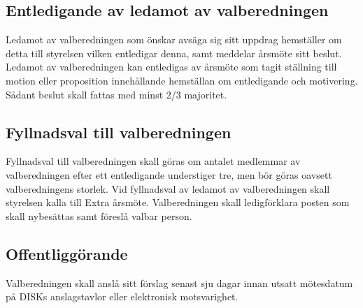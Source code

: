 	\subsection{Entledigande av ledamot av valberedningen}
	\label{subsec:entledigandeavledamotavvalberedningen}
		Ledamot av valberedningen som önskar avsäga sig sitt uppdrag hemställer om detta till styrelsen vilken entledigar denna, samt meddelar årsmöte sitt beslut. Ledamot av valberedningen kan entledigas av årsmöte som tagit ställning till motion eller proposition innehållande hemställan om entledigande och motivering. Sådant beslut skall fattas med minst 2/3 majoritet.

	\subsection{Fyllnadsval till valberedningen}
	\label{subsec:fyllnadsvaltillvalberedningen}
		Fyllnadsval till valberedningen skall göras om antalet medlemmar av valberedningen efter ett entledigande understiger tre, men bör göras oavsett valberedningens storlek. Vid fyllnadsval av ledamot av valberedningen skall styrelsen kalla till Extra årsmöte. Valberedningen skall ledigförklara posten som skall nybesättas samt föreslå valbar person.

	\subsection{Offentliggörande}
	\label{subsec:offentliggorande}
		Valberedningen skall anslå sitt förslag senast sju dagar innan utsatt mötesdatum på DISKs anslagstavlor eller elektronisk motsvarighet.